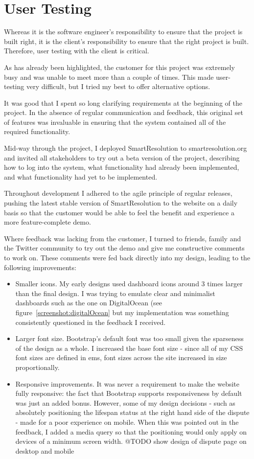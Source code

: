 \section{User Testing}

Whereas it is the software engineer's responsibility to ensure that the project is built right, it is the client's responsibility to ensure that the right project is built. Therefore, user testing with the client is critical.

As has already been highlighted, the customer for this project was extremely busy and was unable to meet more than a couple of times. This made user-testing very difficult, but I tried my best to offer alternative options.

It was good that I spent so long clarifying requirements at the beginning of the project. In the absence of regular communication and feedback, this original set of features was invaluable in ensuring that the system contained all of the required functionality.

Mid-way through the project, I deployed SmartResolution to smartresolution.org and invited all stakeholders to try out a beta version of the project, describing how to log into the system, what functionality had already been implemented, and what functionality had yet to be implemented.

Throughout development I adhered to the agile principle of regular releases, pushing the latest stable version of SmartResolution to the website on a daily basis so that the customer would be able to feel the benefit and experience a more feature-complete demo.

Where feedback was lacking from the customer, I turned to friends, family and the Twitter community to try out the demo and give me constructive comments to work on. These comments were fed back directly into my design, leading to the following improvements:

\begin{itemize}
\item Smaller icons. My early designs used dashboard icons around 3 times larger than the final design. I was trying to emulate clear and minimalist dashboards such as the one on DigitalOcean (see figure~\ref{screenshot:digitalOcean} but my implementation was something consistently questioned in the feedback I received.
\item Larger font size. Bootstrap's default font was too small given the sparseness of the design as a whole. I increased the base font size - since all of my CSS font sizes are defined in ems, font sizes across the site increased in size proportionally.
\item Responsive improvements. It was never a requirement to make the website fully responsive: the fact that Bootstrap supports responsiveness by default was just an added bonus. However, some of my design decisions - such as absolutely positioning the lifespan status at the right hand side of the dispute - made for a poor experience on mobile. When this was pointed out in the feedback, I added a media query so that the positioning would only apply on devices of a minimum screen width. @TODO show design of dispute page on desktop and mobile
\end{itemize}


